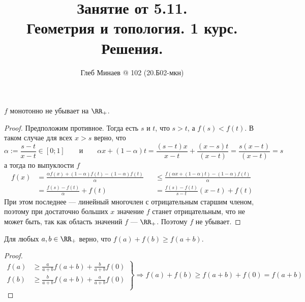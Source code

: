 \documentclass[12pt,a4paper]{article}
\title{Занятие от 5.11.\\Геометрия и топология. 1 курс.\\Решения.}
\author{Глеб Минаев @ 102 (20.Б02-мкн)}
\begin{document}
    \maketitle

    \begin{problem}{9}
        \begin{lemma}
            $f$ монотонно не убывает на $\RR_+$.
        \end{lemma}

        \begin{proof}
            Предположим противное. Тогда есть $s$ и $t$, что $s > t$, а $f(s) < f(t)$. В таком случае для всех $x > s$ верно, что
            \[
                \alpha := \frac{s-t}{x-t} \in [0; 1]\qquad
                \text{и}\qquad
                \alpha x + (1-\alpha) t = \frac{(s-t)x}{x-t} + \frac{(x-s)t}{(x-t)} = \frac{s(x-t)}{(x-t)} = s
            \]
            а тогда по выпуклости $f$
            \begin{align*}
                f(x)
                &= \frac{\alpha f(x) + (1-\alpha) f(t) - (1-\alpha) f(t)}{\alpha}&
                &\leqslant \frac{f(\alpha x + (1-\alpha) t) - (1-\alpha) f(t)}{\alpha}\\
                &= \frac{f(s) - f(t)}{\alpha} + f(t)&
                &= \frac{f(s) - f(t)}{s - t} (x - t) + f(t)
            \end{align*}
            При этом последнее --- линейный многочлен с отрицательным старшим членом, поэтому при достаточно больших $x$ значение $f$ станет отрицательным, что не может быть, так как область значений $f$ --- $\RR_+$. Поэтому $f$ не убывает.
        \end{proof}

        \begin{lemma}
            Для любых $a, b \in \RR_+$ верно, что $f(a) + f(b) \geqslant f(a + b)$.
        \end{lemma}

        \begin{proof}
            \[
                \left.
                \begin{aligned}
                    f(a) &\geqslant \frac{a}{a+b} f(a+b) + \frac{b}{a+b} f(0)\\
                    f(b) &\geqslant \frac{b}{a+b} f(a+b) + \frac{a}{a+b} f(0)\\
                \end{aligned}
                \right\} \Longrightarrow
                f(a) + f(b) \geqslant f(a + b) + f(0) = f(a + b)
            \]
        \end{proof}


\end{problem}
\end{document}
